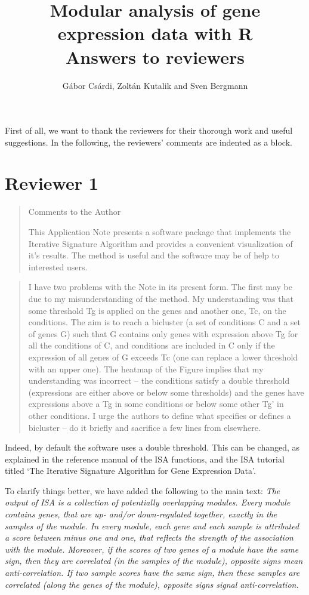 \documentclass[a4paper]{article}
\title{Modular analysis of gene expression data with R\\
  Answers to reviewers}
\author{G\'abor Cs\'ardi, Zolt\'an Kutalik and Sven Bergmann}
\begin{document}
\maketitle

First of all, we want to thank the reviewers for their thorough work
and useful suggestions. In the following, the reviewers' comments are
indented as a block.

\section{Reviewer 1}

\begin{quote}
Comments to the Author

This Application Note presents a software package that implements the
Iterative Signature Algorithm and provides a convenient visualization
of it’s results. The method is useful and the software may be of help
to interested users. 
\end{quote}

\begin{quote}
I have two problems with the Note in its present form.
The first may be due to my misunderstanding of the method. My
understanding was that some threshold Tg is applied on the genes and
another one, Tc, on the conditions. The aim is to reach a bicluster (a
set of conditions C and a set of genes G) such that G contains only
genes with expression above Tg for all the conditions of C, and
conditions are included in C only if the expression of all genes of G
exceeds Tc (one can replace a lower threshold with an upper one). The
heatmap of the Figure implies that my understanding was incorrect –
the conditions satisfy a double threshold (expressions are either
above or below some thresholds) and the genes have expressions above a
Tg in some conditions or below some other Tg’ in other conditions. 
I urge the authors to define what specifies or defines a bicluster –
do it briefly and sacrifice a few lines from elsewhere. 
\end{quote}

Indeed, by default the software uses a double threshold. This can be
changed, as explained in the reference manual of the ISA functions,
and the ISA tutorial titled `The Iterative Signature Algorithm for
Gene Expression Data'.

To  clarify things better, we have added the following to the main
text:
\textsl{The output of ISA is a collection of potentially overlapping
modules. Every module contains genes, that are up- and/or
down-regulated together, exactly in the samples of the module.
In every module, each gene and each sample is attributed a
score between minus one and one, that reflects the strength of the
association with the module. Moreover, if the scores of two genes of a
module have the same sign, then they are correlated (in the samples of
the module), opposite signs mean anti-correlation. If two sample
scores have the same sign, then these samples are correlated (along
the genes of the module), opposite signs signal anti-correlation.}
\end{document}
